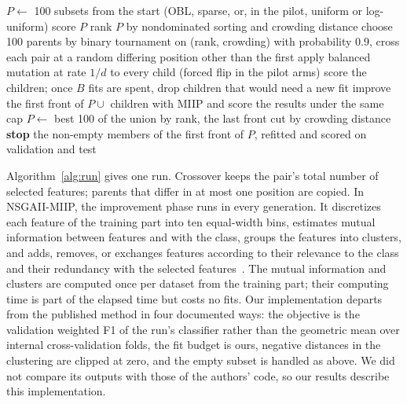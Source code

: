 \begin{algorithm}[!tbp]
\caption{One run of the tested NSGA-II configurations; $B$ is the fit budget and $\mathcal{C}$ the cache}
\label{alg:run}
\small
\begin{algorithmic}[1]
\State $P \gets$ 100 subsets from the start (OBL, sparse, or, in the pilot, uniform or log-uniform)
\State score $P$ 
  \State rank $P$ by nondominated sorting and crowding distance
  \State choose 100 parents by binary tournament on (rank, crowding)
  \State with probability 0.9, cross each pair at a random differing position other than the first
  \State apply balanced mutation at rate $1/d$ to every child (forced flip in the pilot arms)
  \State score the children; once $B$ fits are spent, drop children that would need a new fit
   improve the first front of $P \cup$ children with MIIP and score the results under the same cap \EndIf
  \State $P \gets$ best 100 of the union by rank, the last front cut by crowding distance
   \textbf{stop} \EndIf
\EndWhile
\State \Return the non-empty members of the first front of $P$, refitted and scored on validation and test
\end{algorithmic}
\end{algorithm}

Algorithm~\ref{alg:run} gives one run. Crossover keeps the pair's total number of selected features; parents that differ in at most one position are copied. In NSGAII-MIIP, the improvement phase runs in every generation. It discretizes each feature of the training part into ten equal-width bins, estimates mutual information between features and with the class, groups the features into clusters, and adds, removes, or exchanges features according to their relevance to the class and their redundancy with the selected features~\cite{Li2025}. The mutual information and clusters are computed once per dataset from the training part; their computing time is part of the elapsed time but costs no fits. Our implementation departs from the published method in four documented ways: the objective is the validation weighted F1 of the run's classifier rather than the geometric mean over internal cross-validation folds, the fit budget is ours, negative distances in the clustering are clipped at zero, and the empty subset is handled as above. We did not compare its outputs with those of the authors' code, so our results describe this implementation.

